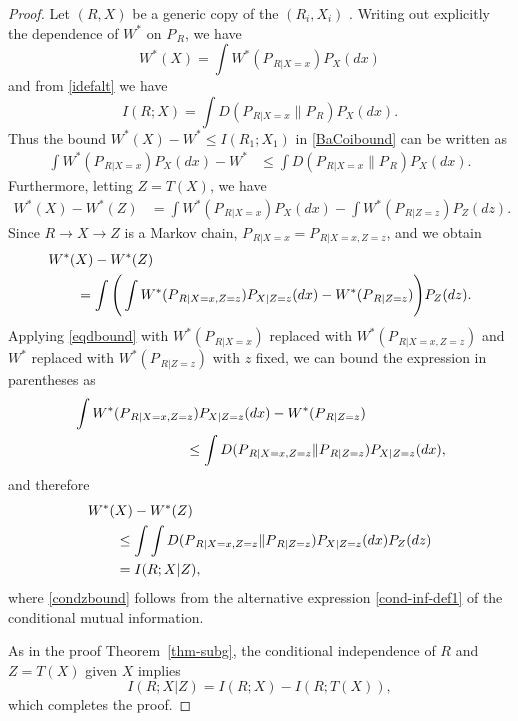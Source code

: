 \documentclass[11pt]{article}
\begin{document}
\begin{proof}
  Let $(R,X)$ be a generic copy of the $(R_i,X_i) $ . 
  Writing out explicitly the dependence of $W^*$ on $P_{\, R}$, we
  have
  \[
  W^*(X) = \int W^*(P_{\, R|X=x}) P_X(dx)
\]
and from \eqref{idefalt} we have 
\[
I(R; X)= \int D(P_{\, R|X=x} \|P_{\, R})  P_X(dx).
\]
Thus the bound $W^*(X)-W^*\le I(R_1;X_1)$ in \eqref{BaCoibound} can be written as 
 \begin{align}
 \int  W^*(P_{\, R|X=x})  P_X(dx) - W^*  &\le  \int D(P_{\, R|X=x} \|P_{\, R})
             P_X(dx).\label{eqdbound} 
 \end{align}
Furthermore, letting $Z=T(X)$, we  have 
 \begin{align*}
    W^*(X) - W^*(Z)  &= \int  W^*(P_{\, R|X=x}) P_X(dx) -  \int
                       W^*(P_{\, R|Z=z}) P_Z(dz). 
 \end{align*}
Since $R\to X\to Z$ is a Markov chain, $P_{\, R|X=x} = P_{\,
  R|X=x,Z=z}$, and we obtain
\begin{align}
  \MoveEqLeft  W^*(X) - W^*(Z)\nonumber \\
  &=  \int \Bigg( \int  W^*(P_{\,R|X=x,Z=z})    P_{X|Z=z}(dx)  -
    W^*(P_{\, R|Z=z}) \Bigg) P_Z(dz) . \nonumber 
\end{align}
Applying \eqref{eqdbound} with  $W^*(P_{\, R|X=x})$ replaced with $W^*(P_{\,R|X=x,Z=z})$  and $ W^*$ replaced with $W^*(P_{\, R|Z=z})$ with $z$ fixed,
we can bound the expression in parentheses as 
\begin{align*}
   \MoveEqLeft[8]   \int  W^*(P_{\,R|X=x,Z=z})    P_{X|Z=z}(dx)  -
    W^*(P_{\, R|Z=z})  \\
    & \le  \int D(P_{\,R|X=x,Z=z}\| P_{\, R|Z=z})
    P_{X|Z=z}(dx), 
\end{align*}
and therefore  
\begin{align}
  \MoveEqLeft W^*(X) - W^*(Z)\nonumber \\
  & \le  \int   \int D(P_{\,R|X=x,Z=z}\| P_{\, R|Z=z})
    P_{X|Z=z}(dx) P_Z(dz) \nonumber \\
  & = I(R;X|Z),  \label{condzbound} 
\end{align}
where \eqref{condzbound} follows from the alternative
expression   \eqref{cond-inf-def1} of the conditional mutual
information.  


As in the proof Theorem~\ref{thm-subg}, the conditional independence of
$R$ and $Z=T(X)$ given $X$ implies
\[
  I(R;X|Z)=  I(R;X)-I(R;T(X)),
\]
which completes the proof. 
\end{proof}
\end{document}
